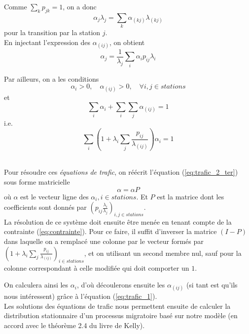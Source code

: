 \documentclass[12pt,a4paper]{article}
\begin{document}
Comme $\sum_k p_{jk} = 1$, on a donc
\begin{equation}
\alpha_j \lambda_j = \sum_k \alpha_{(kj)} \lambda_{(kj)}
\label{eq:trafic_2_bis}
\end{equation}
pour la transition par la station $j$.\\

En injectant l'expression des $\alpha_{(ij)}$, on obtient
\begin{equation}
\alpha_j = \frac{1}{\lambda_j} \sum_i \alpha_i p_{ij} \lambda_i
\label{eq:trafic_2_ter}
\end{equation}


Par ailleurs, on a les conditions
\[
\alpha_i > 0, \quad \alpha_{(ij)} >0, \quad \forall i,j \in stations 
\]
et
\begin{equation}
\sum_i \alpha_i + \sum_i \sum_j \alpha_{(ij)} = 1
\end{equation}
i.e.
\begin{equation}
\sum_i \left(1 + \lambda_i \sum_j \frac{p_{ij}}{\lambda_{(ij)}} \right) \alpha_i = 1
\label{eq:contrainte}
\end{equation}

~\\
Pour résoudre ces \textit{équations de trafic}, on réécrit l'équation (\ref{eq:trafic_2_ter}) sous forme matricielle
\begin{equation}
\alpha = \alpha P
\end{equation}
où $\alpha$ est le vecteur ligne des $\alpha_i, i \in stations$. Et $P$ est la matrice dont les coefficients sont donnés par $\left( p_{ij} \frac{\lambda_i}{\lambda_j} \right)_{i,j \in stations}$.\\

La résolution de ce système doit ensuite être menée en tenant compte de la contrainte (\ref{eq:contrainte}). Pour ce faire, il suffit d'inverser la matrice $(I-P)$ dans laquelle on a remplacé une colonne par le vecteur formés par $\left(1 + \lambda_i \sum_j \frac{p_{ij}}{\lambda_{(ij)}} \right)_{i \in stations}$, et on utilisant un second membre nul, sauf pour la colonne correspondant à celle modifiée qui doit comporter un $1$.
 
On calculera ainsi les $\alpha_i$, d'où découlerons ensuite les $\alpha_{(ij)}$ (si tant est qu'ils nous intéressent) grâce à l'équation (\ref{eq:trafic_1}).\\

Les solutions des équations de trafic nous permettent ensuite de calculer la distribution stationnaire d'un processus migratoire basé sur notre modèle (en accord avec le théorème 2.4 du livre de Kelly).
\end{document}
